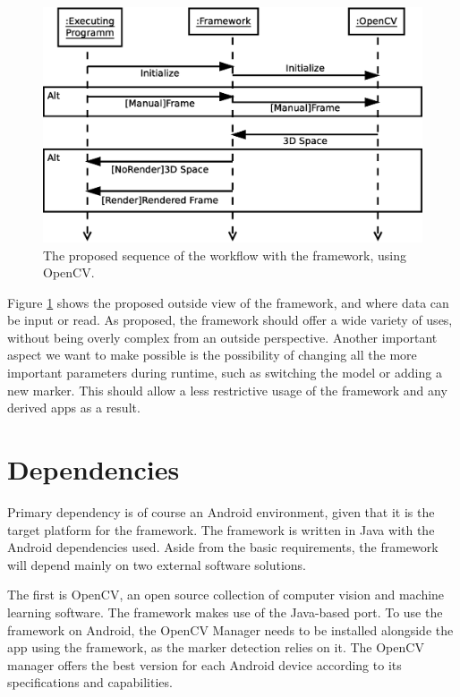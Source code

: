 \begin{figure}
	\centering
	\includegraphics[width=12cm]{img/sequence_access.eps}
	\caption[TODO Access Sequence.]{The proposed sequence of the workflow with the framework, using OpenCV.}
	\label{fig:sequence_access}
\end{figure}

Figure \ref{fig:sequence_access} shows the proposed outside view of the framework, and where data can be input or read.
As proposed, the framework should offer a wide variety of uses, without being overly complex from an outside perspective.
Another important aspect we want to make possible is the possibility of changing all the more important parameters during runtime, such as switching the model or adding a new marker.
This should allow a less restrictive usage of the framework and any derived apps as a result.

\section{Dependencies}

Primary dependency is of course an Android environment, given that it is the target platform for the framework.
The framework is written in Java with the Android dependencies used.
Aside from the basic requirements, the framework will depend mainly on two external software solutions.

The first is OpenCV\cite{opencv}, an open source collection of computer vision and machine learning software.
The framework makes use of the Java-based port.
To use the framework on Android, the OpenCV Manager\cite{opencvmanager} needs to be installed alongside the app using the framework, as the marker detection relies on it.
The OpenCV manager offers the best version for each Android device according to its specifications and capabilities.

